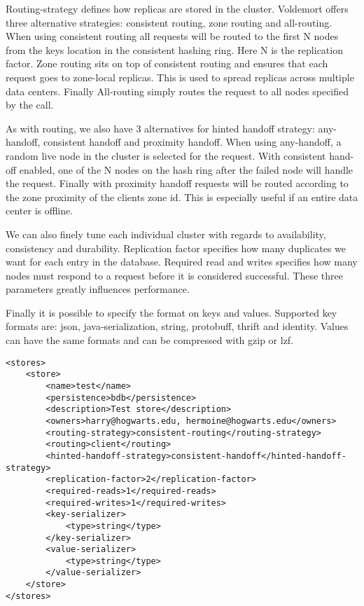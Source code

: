 \begin{itemize}
Routing-strategy defines how replicas are stored in the cluster. Voldemort offers three alternative strategies: consistent routing, zone routing and all-routing. When using consistent routing all requests will be routed to the first N nodes from the keys location in the consistent hashing ring. Here N is the replication factor. Zone routing sits on top of consistent routing and ensures that each request goes to zone-local replicas. This is used to spread replicas across multiple data centers. Finally All-routing simply routes the request to all nodes specified by the call. 

As with routing, we also have 3 alternatives for hinted handoff strategy: any-handoff, consistent handoff and proximity handoff. When using any-handoff, a random live node in the cluster is selected for the request. With consistent hand-off enabled, one of the N nodes on the hash ring after the failed node will handle the request. Finally with proximity handoff requests will be routed according to the zone proximity of the clients zone id. This is especially useful if an entire data center is offline. 

We can also finely tune each individual cluster with regards to availability, consistency and durability. Replication factor specifies how many duplicates we want for each entry in the database. Required read and writes specifies how many nodes must respond to a request before it is considered successful. These three parameters greatly influences performance. 

Finally it is possible to specify the format on keys and values. Supported key formats are: json, java-serialization, string, protobuff, thrift and identity. Values can have the same formats and can be compressed with gzip or lzf. 

\begin{verbatim}
<stores>
    <store>
        <name>test</name>
        <persistence>bdb</persistence>
        <description>Test store</description>
        <owners>harry@hogwarts.edu, hermoine@hogwarts.edu</owners>
        <routing-strategy>consistent-routing</routing-strategy>
        <routing>client</routing>
        <hinted-handoff-strategy>consistent-handoff</hinted-handoff-strategy>
        <replication-factor>2</replication-factor>
        <required-reads>1</required-reads>
        <required-writes>1</required-writes>
        <key-serializer>
            <type>string</type>
        </key-serializer>
        <value-serializer>
            <type>string</type>
        </value-serializer>
    </store>
</stores>
\end{verbatim}


\end{itemize}
